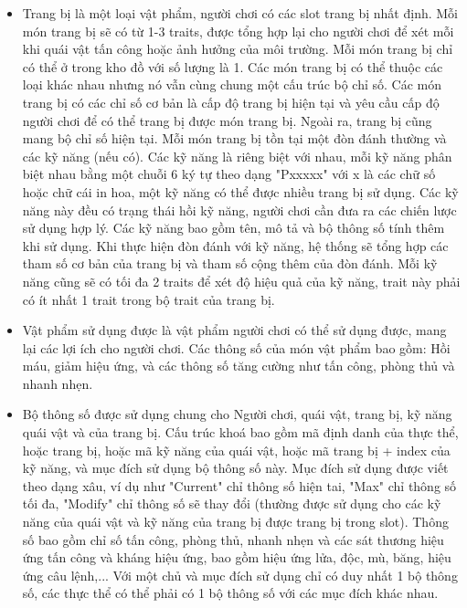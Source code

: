 \begin{itemize}
	\item Trang bị là một loại vật phẩm, người chơi có các slot trang bị nhất định. Mỗi món trang bị sẽ có từ 1-3 traits, được tổng hợp lại cho người chơi để xét mỗi khi quái vật tấn công hoặc ảnh hưởng của môi trường. Mỗi món trang bị chỉ có thể ở trong kho đồ với số lượng là 1. Các món trang bị có thể thuộc các loại khác nhau nhưng nó vẫn cùng chung một cấu trúc bộ chỉ số. Các món trang bị có các chỉ số cơ bản là cấp độ trang bị hiện tại và yêu cầu cấp độ người chơi để có thể trang bị được món trang bị. Ngoài ra, trang bị cũng mang bộ chỉ số hiện tại. Mỗi món trang bị tồn tại một đòn đánh thường và các kỹ năng (nếu có). Các kỹ năng là riêng biệt với nhau, mỗi kỹ năng phân biệt nhau bằng một chuỗi 6 ký tự theo dạng "Pxxxxx" với x là các chữ số hoặc chữ cái in hoa, một kỹ năng có thể được nhiều trang bị sử dụng. Các kỹ năng này đều có trạng thái hồi kỹ năng, người chơi cần đưa ra các chiến lược sử dụng hợp lý. Các kỹ năng bao gồm tên, mô tả và bộ thông số tính thêm khi sử dụng. Khi thực hiện đòn đánh với kỹ năng, hệ thống sẽ tổng hợp các tham số cơ bản của trang bị và tham số cộng thêm của đòn đánh. Mỗi kỹ năng cũng sẽ có tối đa 2 traits để xét độ hiệu quả của kỹ năng, trait này phải có ít nhất 1 trait trong bộ trait của trang bị.
	\item Vật phẩm sử dụng được là vật phẩm người chơi có thể sử dụng được, mang lại các lợi ích cho người chơi. Các thông số của món vật phẩm bao gồm: Hồi máu, giảm hiệu ứng, và các thông số tăng cường như tấn công, phòng thủ và nhanh nhẹn.
	\item Bộ thông số được sử dụng chung cho Người chơi, quái vật, trang bị, kỹ năng quái vật và của trang bị. Cấu trúc khoá bao gồm mã định danh của thực thể, hoặc trang bị, hoặc mã kỹ năng của quái vật, hoặc mã trang bị + index của kỹ năng, và mục đích sử dụng bộ thông số này. Mục đích sử dụng được viết theo dạng xâu, ví dụ như "Current" chỉ thông số hiện tai, "Max" chỉ thông số tối đa, "Modify" chỉ thông số sẽ thay đổi (thường được sử dụng cho các kỹ năng của quái vật và kỹ năng của trang bị được trang bị trong slot). Thông số bao gồm chỉ số tấn công, phòng thủ, nhanh nhẹn và các sát thương hiệu ứng tấn công và kháng hiệu ứng, bao gồm hiệu ứng lửa, độc, mù, băng, hiệu ứng câu lệnh,... Với một chủ và mục đích sử dụng chỉ có duy nhất 1 bộ thông số, các thực thể có thể phải có 1 bộ thông số với các mục đích khác nhau. 

\end{itemize}
